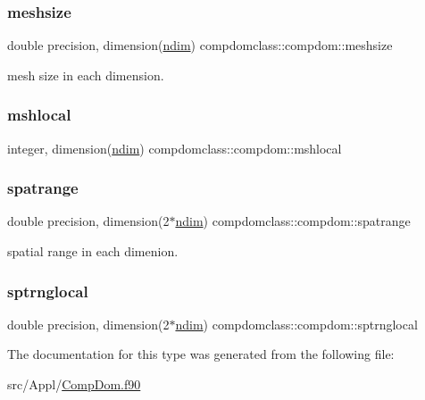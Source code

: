 \subsubsection{\texorpdfstring{meshsize}{meshsize}}
{\footnotesize\ttfamily double precision, dimension(\mbox{\hyperlink{namespacecompdomclass_a01f031d8af670f66db4484cd6411e99f}{ndim}}) compdomclass\+::compdom\+::meshsize}



mesh size in each dimension. 

\mbox{\label{structcompdomclass_1_1compdom_a21d05738eabd33f56f26879055af6343}} 
\subsubsection{\texorpdfstring{mshlocal}{mshlocal}}
{\footnotesize\ttfamily integer, dimension(\mbox{\hyperlink{namespacecompdomclass_a01f031d8af670f66db4484cd6411e99f}{ndim}}) compdomclass\+::compdom\+::mshlocal}

\mbox{\label{structcompdomclass_1_1compdom_a55068267999d67699122c91b366a0682}} 
\subsubsection{\texorpdfstring{spatrange}{spatrange}}
{\footnotesize\ttfamily double precision, dimension(2$\ast$\mbox{\hyperlink{namespacecompdomclass_a01f031d8af670f66db4484cd6411e99f}{ndim}}) compdomclass\+::compdom\+::spatrange}



spatial range in each dimenion. 

\mbox{\label{structcompdomclass_1_1compdom_a2a2654ff7dd41dbb57b11a089e568123}} 
\subsubsection{\texorpdfstring{sptrnglocal}{sptrnglocal}}
{\footnotesize\ttfamily double precision, dimension(2$\ast$\mbox{\hyperlink{namespacecompdomclass_a01f031d8af670f66db4484cd6411e99f}{ndim}}) compdomclass\+::compdom\+::sptrnglocal}



The documentation for this type was generated from the following file\+:\begin{DoxyCompactItemize}
\item 
src/\+Appl/\mbox{\hyperlink{_comp_dom_8f90}{Comp\+Dom.\+f90}}\end{DoxyCompactItemize}

